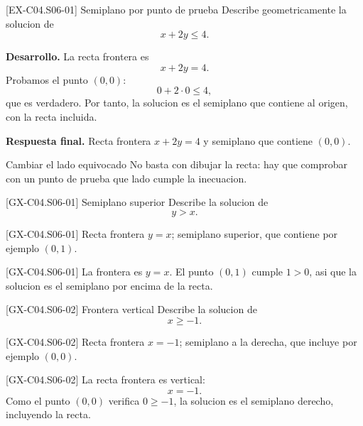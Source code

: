 \begin{solvedexample}{[EX-C04.S06-01] Semiplano por punto de prueba}
Describe geometricamente la solucion de
\[
x+2y\leq 4.
\]

\textbf{Desarrollo.} La recta frontera es
\[
x+2y=4.
\]
Probamos el punto \((0,0)\):
\[
0+2\cdot 0\leq 4,
\]
que es verdadero. Por tanto, la solucion es el semiplano que contiene al origen, con la recta
incluida.

\textbf{Respuesta final.}
Recta frontera \(x+2y=4\) y semiplano que contiene \((0,0)\).
\end{solvedexample}

\begin{commonerror}{Cambiar el lado equivocado}
No basta con dibujar la recta: hay que comprobar con un punto de prueba que lado cumple la
inecuacion.
\end{commonerror}

\begin{guidedexercise}{[GX-C04.S06-01] Semiplano superior}
Describe la solucion de
\[
y>x.
\]
\end{guidedexercise}

\begin{shortanswer}{[GX-C04.S06-01]}
Recta frontera \(y=x\); semiplano superior, que contiene por ejemplo \((0,1)\).
\end{shortanswer}

\begin{fullsolution}{[GX-C04.S06-01]}
La frontera es \(y=x\). El punto \((0,1)\) cumple \(1>0\), asi que la solucion es el semiplano
por encima de la recta.
\end{fullsolution}

\begin{guidedexercise}{[GX-C04.S06-02] Frontera vertical}
Describe la solucion de
\[
x\geq -1.
\]
\end{guidedexercise}

\begin{shortanswer}{[GX-C04.S06-02]}
Recta frontera \(x=-1\); semiplano a la derecha, que incluye por ejemplo \((0,0)\).
\end{shortanswer}

\begin{fullsolution}{[GX-C04.S06-02]}
La recta frontera es vertical:
\[
x=-1.
\]
Como el punto \((0,0)\) verifica \(0\geq -1\), la solucion es el semiplano derecho, incluyendo
la recta.
\end{fullsolution}

